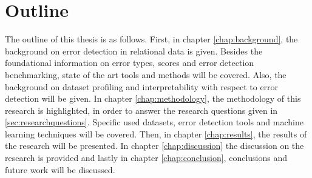 \section{Outline}
\label{sec:outline}
The outline of this thesis is as follows. 
First, in chapter \ref{chap:background}, the background on error detection in relational data is given. Besides the foundational information on error types, scores and error detection benchmarking, state of the art tools and methods will be covered. Also, the background on dataset profiling and interpretability with respect to error detection will be given. 
In chapter \ref{chap:methodology}, the methodology of this research is highlighted, in order to answer the research questions given in \ref{sec:researchquestions}. Specific used datasets, error detection tools and machine learning techniques will be covered.
Then, in chapter \ref{chap:results}, the results of the research will be presented. 
In chapter \ref{chap:discussion} the discussion on the research is provided and lastly in chapter \ref{chap:conclusion}, conclusions and future work will be discussed.